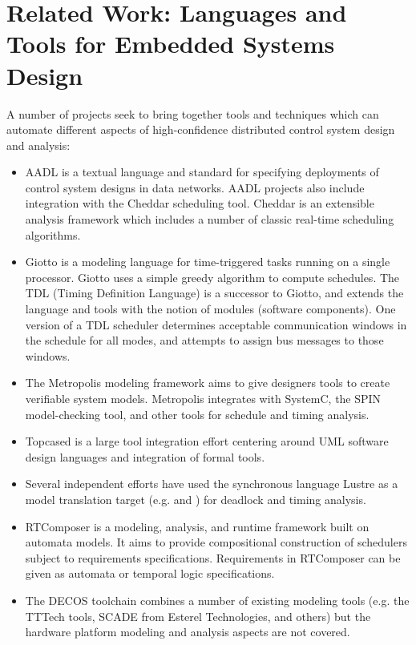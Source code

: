 
\section{Related Work: Languages and Tools for Embedded Systems Design}

A number of projects seek to bring together 
tools and techniques which can automate different
aspects of high-confidence distributed control system design and analysis:

\begin{itemize}

\item AADL is a textual language and standard for 
specifying deployments of control system designs in data 
networks\cite{modeling:aadl_control_systems}.  AADL 
projects also include integration with the Cheddar 
scheduling tool\cite{sched:aadl_sched}. Cheddar is 
an extensible analysis framework which includes a 
number of classic real-time scheduling 
algorithms\cite{sched:cheddar}.

\item Giotto\cite{modeling:giotto3} is a modeling 
language for time-triggered tasks running on a single 
processor.  Giotto uses a simple greedy algorithm to 
compute schedules.   The TDL (Timing 
Definition Language) is a successor to Giotto, and 
extends the language and tools with the notion of 
modules (software components)\cite{timed:tdl}.  One version 
of a TDL scheduler determines acceptable communication windows 
in the schedule for all modes, and attempts to assign bus 
messages to those windows\cite{timed:tdlflexray}.

\item The Metropolis modeling framework\cite{modeling:metropolis} 
aims to give designers tools to create verifiable system models.  
Metropolis integrates with SystemC, the SPIN model-checking tool, 
and other tools for schedule and timing analysis. 

\item Topcased\cite{tools:Topcased} is a large tool integration effort
centering around UML software design languages and integration of
formal tools.

\item Several independent efforts have used the synchronous 
language Lustre as a model translation target 
(e.g. \cite{modeling:lustre2} and \cite{modeling:lustre1}) 
for deadlock and timing analysis.

\item RTComposer\cite{modeling:rtcomposer} is a 
modeling, analysis, and runtime framework built on 
automata models.  It aims to provide compositional 
construction of schedulers subject to requirements 
specifications.  Requirements in RTComposer can be 
given as automata or temporal logic specifications.  

\item The DECOS toolchain \cite{modeling:decos} 
combines a number of existing modeling tools (e.g. the 
TTTech tools, SCADE from Esterel Technologies, 
and others) but the hardware platform modeling 
and analysis aspects are not covered.

\end{itemize}


